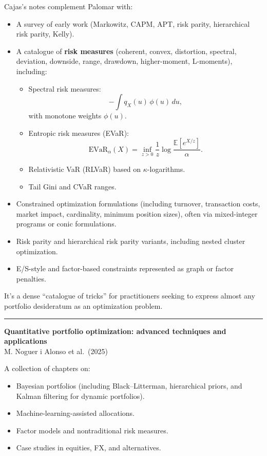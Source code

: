 \documentclass[a5paper]{article}
\providecommand{\tightlist}{%
  \setlength{\itemsep}{0pt}\setlength{\parskip}{0pt}}
\begin{document}
Cajas's notes complement Palomar with:

\begin{itemize}
\item
  A survey of early work (Markowitz, CAPM, APT, risk parity,
  hierarchical risk parity, Kelly).
\item
  A catalogue of \textbf{risk measures} (coherent, convex, distortion,
  spectral, deviation, downside, range, drawdown, higher-moment,
  L-moments), including:

  \begin{itemize}
  \tightlist
  \item
    Spectral risk measures:
    \[ -\int q_X(u)\,\phi(u)\,du , \] with monotone
    weights $\phi(u)$.
  \item
    Entropic risk measures (EVaR):
    \[ \mathrm{EVaR}_\alpha(X)=\inf_{z>0}\frac{1}{z}\log \frac{\mathbb{E}[e^{X/z}]}{\alpha}. \]
  \item
    Relativistic VaR (RLVaR) based on $\kappa$-logarithms.
  \item
    Tail Gini and CVaR ranges.
  \end{itemize}
\item
  Constrained optimization formulations (including turnover, transaction
  costs, market impact, cardinality, minimum position sizes), often via
  mixed-integer programs or conic formulations.
\item
  Risk parity and hierarchical risk parity variants, including nested
  cluster optimization.
\item
  E/S-style and factor-based constraints represented as graph or factor
  penalties.
\end{itemize}

It's a dense ``catalogue of tricks'' for practitioners seeking to
express almost any portfolio desideratum as an optimization problem.

\begin{center}\rule{0.5\linewidth}{0.5pt}\end{center}

\textbf{Quantitative portfolio optimization: advanced techniques and
applications}\\
M. Noguer i Alonso et al.~(2025)

A collection of chapters on:

\begin{itemize}
\tightlist
\item
  Bayesian portfolios (including Black--Litterman, hierarchical priors,
  and Kalman filtering for dynamic portfolios).
\item
  Machine-learning-assisted allocations.
\item
  Factor models and nontraditional risk measures.
\item
  Case studies in equities, FX, and alternatives.
\end{itemize}
\end{document}
